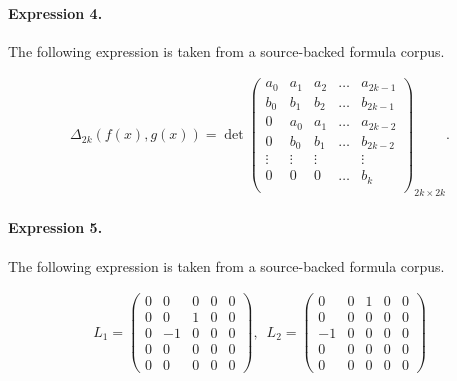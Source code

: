 \documentclass[11pt]{article}
\begin{document}
\paragraph{Expression 4.} The following expression is taken from a source-backed formula corpus.

\begin{align*} \Delta_{2 k}\left( f(x),g(x) \right)= \det \left( \begin{array}{ccccc} a_0 & a_1 & a_2 & \dots & a_{2k-1}\\ b_0 & b_1 & b_2 & \dots & b_{2k-1}\\ 0 & a_0 & a_1 & \dots & a_{2k-2}\\ 0 & b_0 & b_1 & \dots & b_{2k-2}\\ \vdots&\vdots&\vdots& & \vdots\\ 0 & 0 & 0 & \dots & b_{k}\\ \end{array}\right)_{2k \times 2k}.\end{align*}

\paragraph{Expression 5.} The following expression is taken from a source-backed formula corpus.

\begin{align*}L_1=\left( \begin{array}{ccccc}0 & 0 & 0 & 0 & 0 \\ 0 & 0 & 1 & 0 & 0 \\ 0 & -1 & 0 & 0 & 0 \\ 0 & 0 & 0 & 0 & 0 \\ 0 & 0 & 0 & 0 & 0\end{array}\right) ,\,\,\,L_2=\left( \begin{array}{ccccc}0 & 0 & 1 & 0 & 0 \\ 0 & 0 & 0 & 0 & 0 \\ -1 & 0 & 0 & 0 & 0 \\ 0 & 0 & 0 & 0 & 0 \\ 0 & 0 & 0 & 0 & 0\end{array}\right)\end{align*}
\end{document}
